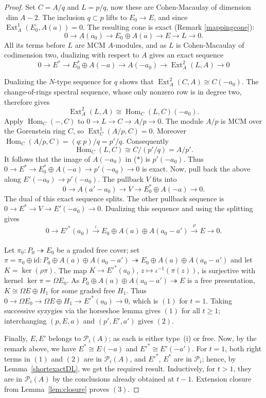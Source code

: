 \documentclass[11pt,letterpaper]{amsart}
\newcommand{\x}{\xrightarrow{}}
\DeclareMathOperator{\h}{Hom}
\DeclareMathOperator{\Ext}{Ext}
\theoremstyle{plain}
\theoremstyle{definition}
\theoremstyle{remark}
\begin{document}
\begin{proof}
Set $C=A/q$ and $L=p/q$, now these are Cohen-Macaulay of dimension
$\dim A-2$. The inclusion $q\subset p$ lifts to $E_0\to E$, and since
$\Ext_A^1(E_0,A(a))=0$. The resulting cone is exact (Remark \ref{mappingcone}):\[
 0\x A(a_0)\x E_0\oplus A(a)\x E\x L\x0.\]
All its terms before $L$ are MCM $A$-modules, and as $L$ is Cohen-Macaulay of codimension two, dualizing with respect to $A$ gives an exact sequence
\[0\x E^*\x E_0^*\oplus A(-a)\x A(-a_0) \x\Ext_A^2(L,A)\x0\tag{$\ast$}\]

Dualizing the $N$-type sequence for $q$ shows that
$\Ext_A^2(C,A)\cong C(-a_0)$. The change-of-rings spectral
sequence, whose only nonzero row is in degree two, therefore gives
\[
 \Ext_A^2(L,A)\cong\h_C(L,C)(-a_0).
\]
Apply $\h_C(-,C)$ to $0\to L\to C\to A/p\to0$.
The module $A/p$ is MCM over the Gorenstein ring $C$, so
$\Ext_C^1(A/p,C)=0$. Moreover
$\h_C(A/p,C)=(q:p)/q=p'/q$. Consequently
\[
 \h_C(L,C)\cong C/(p'/q)=A/p'.
\]
It follows that the image of $A(-a_0)$ in ($\ast$) is $p'(-a_0)$. Thus $0\x E^*\x E_0^*\oplus A(-a)\x p'(-a_0)\x0$ is exact. Now, pull back the above along
$E'(-a_0)\to p'(-a_0)$. The pullback $V$ fits into
\[
 0\x A(a'-a_0)\x V\x E_0^*\oplus A(-a)\x0.
\]
The dual of this exact sequence splits. 
The other pullback sequence is
$0\to E^*\to V\to E'(-a_0)\to0$.
Dualizing this sequence and using the splitting gives
\[
 0\x E'^*(a_0)\xrightarrow{\iota}
 E_0\oplus A(a)\oplus A(a_0-a')\xrightarrow[]{\rho} E\x0.
\]

Let $\pi_0:P_0\twoheadrightarrow E_0$ be a graded free cover; set
$\pi=\pi_0\oplus\mathrm{id}:P_0\oplus A(a)\oplus
A(a_0-a')\twoheadrightarrow E_0\oplus A(a)\oplus A(a_0-a')$ and let $K=\ker(\rho\pi)$.
The map $K\to E'^*(a_0)$, $z\mapsto\iota^{-1}(\pi(z))$, is surjective
with kernel $\ker\pi=\Omega E_0$. As $P_0\oplus A(a)\oplus
A(a_0-a')\twoheadrightarrow E$ is a free presentation,
$K\cong\Omega E\oplus H_1$ for some graded free $H_1$.
Thus $0\to\Omega E_0\to\Omega E\oplus H_1\to E'^*(a_0)\to0$,
which is $(1)$ for $t=1$.
Taking successive syzygies via the horseshoe lemma gives
$(1)$ for all $t\geq1$; interchanging
$(p,E,a)$ and $(p',E',a')$ gives $(2)$.

Finally, $E,E'$ belongs to $\mathcal{P}_{i}(A)$; as each is either type~(i) or free. Now, by the remark above, we have 
$E^*\cong E(-a)$ and $E'^*\cong E'(-a')$.
For $t=1$, both right terms in $(1)$ and $(2)$
are in $\mathcal{P}_{i}(A)$, and $E'^*$, $E^*$ are in $\mathcal{P}_{i}$; hence, by Lemma~\ref{shortexactDL}, we get the required result.
Inductively, for $t>1$, they are in $\mathcal{P}_{i}(A)$ by the conclusions
already obtained at $t-1$.
Extension closure from Lemma~\ref{lem:closure} proves $(3)$.
\end{proof}
\end{document}
